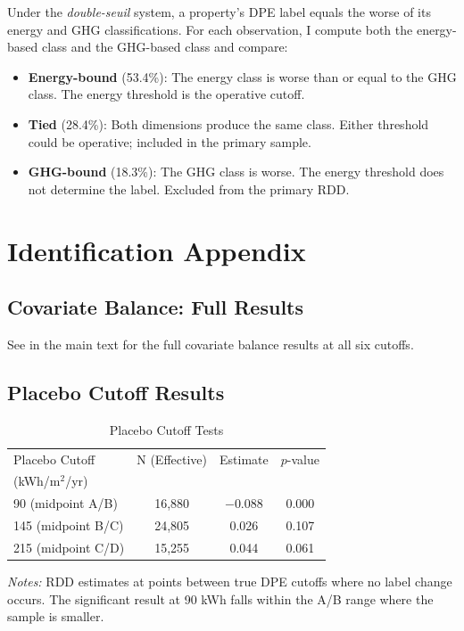 \documentclass[12pt]{article}
\begin{document}
Under the \textit{double-seuil} system, a property's DPE label equals the worse of its energy and GHG classifications. For each observation, I compute both the energy-based class and the GHG-based class and compare:

\begin{itemize}
    \item \textbf{Energy-bound} (53.4\%): The energy class is worse than or equal to the GHG class. The energy threshold is the operative cutoff.
    \item \textbf{Tied} (28.4\%): Both dimensions produce the same class. Either threshold could be operative; included in the primary sample.
    \item \textbf{GHG-bound} (18.3\%): The GHG class is worse. The energy threshold does not determine the label. Excluded from the primary RDD.
\end{itemize}


\section{Identification Appendix}

\subsection{Covariate Balance: Full Results}

See  in the main text for the full covariate balance results at all six cutoffs.

\subsection{Placebo Cutoff Results}

\begin{table}[H]
\centering
\caption{Placebo Cutoff Tests}
\label{tab:placebo}
\begin{tabular}{l c c c}
\hline\hline
Placebo Cutoff & N (Effective) & Estimate & $p$-value \\
(kWh/m$^2$/yr) & & & \\
\hline
90 (midpoint A/B) & 16,880 & $-0.088$ & 0.000 \\
145 (midpoint B/C) & 24,805 & 0.026 & 0.107 \\
215 (midpoint C/D) & 15,255 & 0.044 & 0.061 \\
\hline\hline
\end{tabular}
\begin{minipage}{0.7\textwidth}
\small\textit{Notes:} RDD estimates at points between true DPE cutoffs where no label change occurs. The significant result at 90 kWh falls within the A/B range where the sample is smaller.
\end{minipage}
\end{table}
\end{document}
